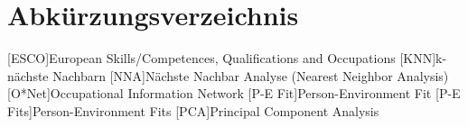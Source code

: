 \renewcommand{\chaptermark}[1]{\markboth{\spacedlowsmallcaps{#1}}{\spacedlowsmallcaps{#1}}}
\renewcommand{\sectionmark}[1]{\markright{\thesection\enspace\spacedlowsmallcaps{#1}}}
\chapter*{Abk\"{u}rzungsverzeichnis}

\begin{acronym}[UML]
	[ESCO]{European Skills/Competences, Qualifications and Occupations}
	[KNN]{k-nächste Nachbarn}
	[NNA]{Nächste Nachbar Analyse (Nearest Neighbor Analysis)}
	[O*Net]{Occupational Information Network}
	[P-E Fit]{Person-Environment Fit}
	[P-E Fits]{Person-Environment Fits}
	[PCA]{Principal Component Analysis}
	
\end{acronym}

\cleardoublepage
